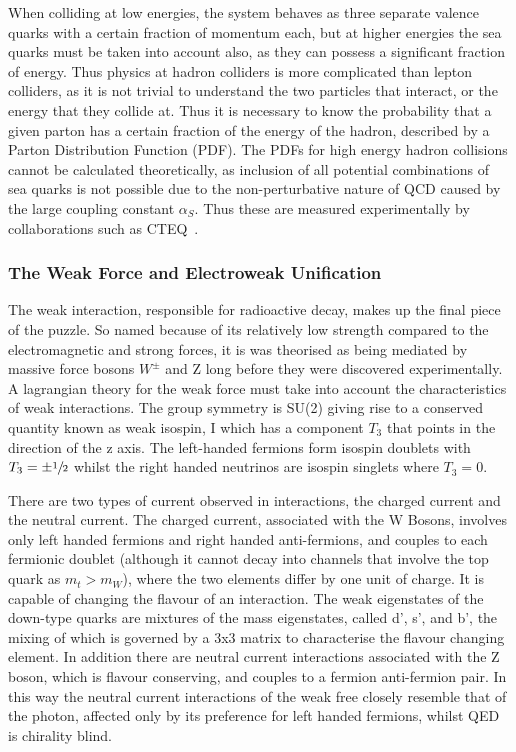  When colliding at low energies, the system behaves as three separate valence quarks with a certain fraction of momentum each, but at higher energies the sea quarks must be taken into account also, as they can possess a significant fraction of energy.  Thus physics at hadron colliders is more complicated than lepton colliders, as it is not trivial to understand the two particles that interact, or the energy that they collide at. Thus it is necessary to know the probability that a given parton has a certain fraction of the energy of the hadron,  described by a Parton Distribution Function (PDF). The PDFs for high energy hadron collisions cannot be calculated theoretically, as inclusion of all potential combinations of sea quarks is not possible due to the non-perturbative nature of QCD caused by the large coupling constant $\alpha_{S}$. Thus these are measured experimentally by collaborations such as CTEQ~\cite{CTEQ}. 
 


\subsubsection{The Weak Force and Electroweak Unification}

The weak interaction, responsible for radioactive decay, makes up the final piece of the puzzle. So named because of its relatively low strength compared to the electromagnetic and strong forces, it is was theorised as being mediated by massive force bosons $W^{\pm}$ and Z long before they were discovered experimentally. A lagrangian theory for the weak force must take into account the characteristics of weak interactions. The group symmetry is SU(2) giving rise to a conserved quantity known as weak isospin, I which has a component $T_{3}$ that points in the direction of the z axis. The left-handed fermions form isospin doublets with $T_{3} = \pm \sfrac{1}{2}$ whilst the right handed neutrinos are isospin singlets where $T_{3} = 0$.

There are two types of current observed in interactions, the charged current and the neutral current\cite{PichSM}. The charged current, associated with the W Bosons, involves only left handed fermions and right handed anti-fermions, and couples to each fermionic doublet (although it cannot decay into channels that involve the top quark as $m_{t} > m_{W}$), where the two elements differ by one unit of charge. It is capable of changing the flavour of an interaction. The weak eigenstates of the down-type quarks are mixtures of the mass eigenstates, called d', s', and b', the mixing of which is governed by a 3x3 matrix to characterise the flavour changing element.  In addition there are neutral current interactions associated with the Z boson, which is flavour conserving, and couples to a fermion anti-fermion pair. In this way the neutral current interactions of the weak free closely resemble that of the photon, affected only by its preference for left handed fermions, whilst QED is chirality blind. 

